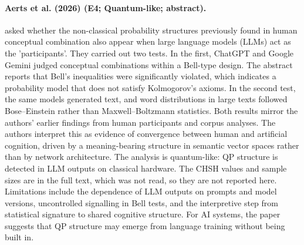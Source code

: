 \documentclass[10pt,a4paper]{article}
\begin{document}
\paragraph{Aerts et al. (2026) (E4; Quantum-like; abstract).} \citet{Aerts2026} asked whether the non-classical probability structures previously found in human conceptual combination also appear when large language models (LLMs) act as the 'participants'. They carried out two tests. In the first, ChatGPT and Google Gemini judged conceptual combinations within a Bell-type design. The abstract reports that Bell's inequalities were significantly violated, which indicates a probability model that does not satisfy Kolmogorov's axioms. In the second test, the same models generated text, and word distributions in large texts followed Bose--Einstein rather than Maxwell--Boltzmann statistics. Both results mirror the authors' earlier findings from human participants and corpus analyses. The authors interpret this as evidence of convergence between human and artificial cognition, driven by a meaning-bearing structure in semantic vector spaces rather than by network architecture. The analysis is quantum-like: QP structure is detected in LLM outputs on classical hardware. The CHSH values and sample sizes are in the full text, which was not read, so they are not reported here. Limitations include the dependence of LLM outputs on prompts and model versions, uncontrolled signalling in Bell tests, and the interpretive step from statistical signature to shared cognitive structure. For AI systems, the paper suggests that QP structure may emerge from language training without being built in.
\end{document}
